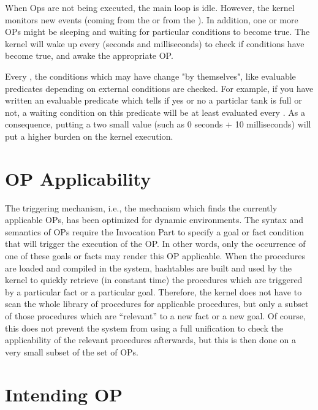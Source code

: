 When Ops are not being executed, the main loop is idle. However, the
kernel monitors new events (coming from the \MPA{} or from the
\OPRSS{}). In addition, one or more OPs might be sleeping and waiting for particular 
conditions to become true. The \OPRSS{} kernel will wake up
every  (seconds and
milliseconds) to check if conditions have become true, and awake the appropriate OP.

Every , the conditions which may have change "by themselves",
like evaluable predicates depending on external conditions are checked. For
example, if you have written an evaluable predicate which tells if yes or no a
particlar tank is full or not, a waiting condition on this predicate will be at
least evaluated every . As a
consequence, putting a two small value (such as 0 seconds + 10 milliseconds)
will put a higher burden on the kernel execution.

\section{OP Applicability}

The triggering mechanism, i.e., the mechanism which finds the currently
applicable OPs, has been optimized for dynamic environments. The syntax and semantics 
of OPs require the Invocation Part to specify a goal or fact condition that will trigger the 
execution of the OP. In other words, only the occurrence of one of
these goals or facts may render this OP applicable. When the procedures are
loaded and compiled in the system, hashtables are built and
used by the kernel to quickly retrieve (in constant time) the
procedures which are triggered by a particular fact or a particular goal.
Therefore, the kernel does not have to scan the whole library of procedures
for applicable procedures, but only a subset of those procedures which are
``relevant'' to a new fact or a new goal. Of course, this does not prevent
the system from using a full unification to check the applicability of the
relevant procedures afterwards, but this is then done on a very small
subset of the set of OPs.

\section{Intending OP}


